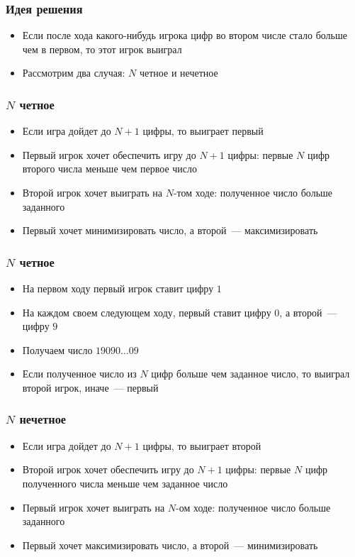 \begin{frame}
  \frametitle{Идея решения}
  \begin{itemize}
    \item Если после хода какого-нибудь игрока цифр во втором числе стало больше чем в первом, то этот игрок выиграл
    \item Рассмотрим два случая: $N$ четное и нечетное
  \end{itemize}
\end{frame}
              
\begin{frame}
  \frametitle{$N$ четное}
  \begin{itemize}
    \item                                                                                 
      Если игра дойдет до $N + 1$ цифры, то выиграет первый
    \item
			Первый игрок хочет обеспечить игру до $N + 1$ цифры: первые $N$ цифр второго числа меньше чем первое число
		\item
			Второй игрок хочет выиграть на $N$-том ходе: полученное число больше заданного
		\item
			Первый хочет минимизировать число, а второй~--- максимизировать
  \end{itemize}
\end{frame}

\begin{frame}
  \frametitle{$N$ четное}
  \begin{itemize}
  	\item
  		На первом ходу первый игрок ставит цифру $1$
    \item
    	На каждом своем следующем ходу, первый ставит цифру $0$, а второй~--- цифру $9$
    \item
    	Получаем число $19090 \ldots 09$
   	\item
   		Если полученное число из $N$ цифр больше чем заданное число, то выиграл второй игрок, иначе~--- первый
  \end{itemize}
\end{frame}

\begin{frame}
  \frametitle{$N$ нечетное}
  \begin{itemize}
    \item                                                                                 
      Если игра дойдет до $N + 1$ цифры, то выиграет второй
    \item
			Второй игрок хочет обеспечить игру до $N + 1$ цифры: первые $N$ цифр полученного числа меньше чем заданное число
		\item
			Первый игрок хочет выиграть на $N$-ом ходе: полученное число больше заданного
		\item
			Первый хочет максимизировать число, а второй~--- минимизировать
  \end{itemize}
\end{frame}


